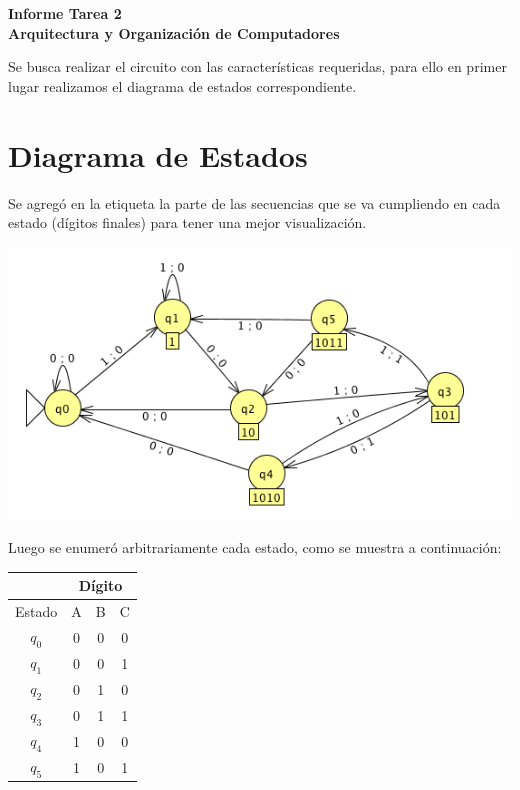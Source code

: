 \documentclass[11pt,letterpaper]{article}
\newcommand{\titulo}{Informe Tarea 2 \\ Arquitectura y Organización de Computadores}
\renewcommand{\maketitle}
{
\thispagestyle{fancy}
\begin{center}
\begin{Large}
\textbf{\titulo}\\
\end{Large}
\end{center}
\vspace{0.3cm}
}
\begin{document}
\setcounter{secnumdepth}{0}
\maketitle
Se busca realizar el circuito con las características requeridas, para ello en primer lugar realizamos el diagrama de estados correspondiente.
\section{Diagrama de Estados}

Se agregó en la etiqueta la parte de las secuencias que se va cumpliendo en cada estado (dígitos finales) para tener una mejor visualización.
\begin{center}
\includegraphics[width=15cm]{diag-estados.png}
\end{center}

Luego se enumeró arbitrariamente cada estado, como se muestra a continuación:
\vspace{0.2cm}
\begin{table}[h]
\centering
\begin{tabular}{c|c|c|c|}
\cline{2-4}
                             & \multicolumn{3}{c|}{Dígito} \\ \hline
\multicolumn{1}{|c|}{Estado} & A       & B       & C       \\ \hline
\multicolumn{1}{|c|}{$q_0$}     & 0       & 0       & 0       \\ \hline
\multicolumn{1}{|c|}{$q_1$}     & 0       & 0       & 1       \\ \hline
\multicolumn{1}{|c|}{$q_2$}     & 0       & 1       & 0       \\ \hline
\multicolumn{1}{|c|}{$q_3$}     & 0       & 1       & 1       \\ \hline
\multicolumn{1}{|c|}{$q_4$}     & 1       & 0       & 0       \\ \hline
\multicolumn{1}{|c|}{$q_5$}     & 1       & 0       & 1       \\ \hline
\end{tabular}
\end{table}
\end{document}
